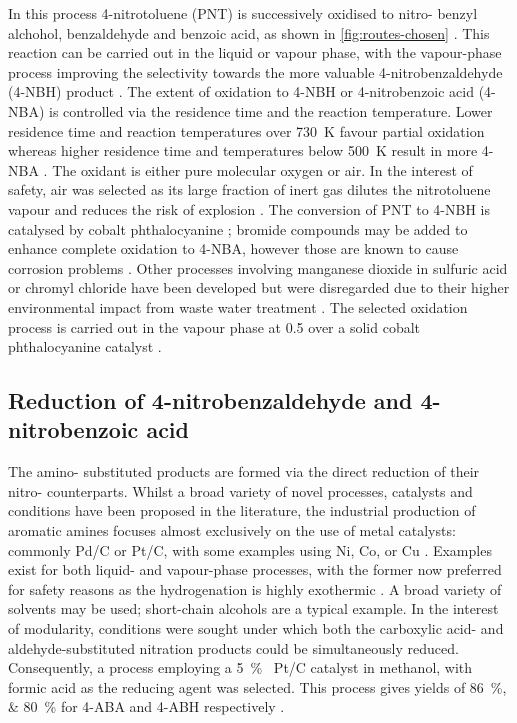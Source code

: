 In this process 4-nitrotoluene (PNT) is successively oxidised to nitro- benzyl alchohol, benzaldehyde and benzoic acid, as shown in \cref{fig:routes-chosen} \cite{hoorn_modelling_2005}. This reaction can be carried out in the liquid or vapour phase, with the vapour-phase process improving the selectivity towards the more valuable 4-nitrobenzaldehyde (4-NBH) product \cite{bruhne_benzaldehyde_2011}. 
The extent of oxidation to 4-NBH or 4-nitrobenzoic acid (4-NBA) is controlled via the residence time and the reaction temperature. Lower residence time and reaction temperatures over \SI{730}{\K} favour partial oxidation whereas higher residence time and temperatures below \SI{500}{\K} result in more 4-NBA \cite{bruhne_benzaldehyde_2011,tan_kinetic_2010}.
The oxidant is either pure molecular oxygen or air. In the interest of safety, air was selected as its large fraction of inert  gas dilutes the nitrotoluene vapour and reduces the risk of explosion \cite{bruhne_benzaldehyde_2011}. 
The conversion of PNT to 4-NBH is catalysed by cobalt phthalocyanine \cite{wendt_reaction_1986}; bromide compounds may be added to enhance complete oxidation to 4-NBA, however those are known to cause corrosion problems \cite{opgrande_benzoic_2003}.
Other processes involving manganese dioxide in sulfuric acid or chromyl chloride have been developed but were disregarded due to their higher environmental impact from waste water treatment \cite{bruhne_benzaldehyde_2011}.
The selected oxidation process is carried out in the vapour phase at \SI{0.5}{\atm} over a solid cobalt phthalocyanine catalyst \cite{chandalia_kinetics_1999}. 


\subsection{Reduction of 4-nitrobenzaldehyde and 4-nitrobenzoic acid}

The amino- substituted products are formed via the direct reduction of their nitro- counterparts.
Whilst a broad variety of novel processes, catalysts and conditions have been proposed in the literature, the industrial production of aromatic amines focuses almost exclusively on the use of metal catalysts: commonly Pd/C or Pt/C, with some examples using Ni, Co, or Cu \cite{vogt_amines_2000,cartolano_amines_2004}.
Examples exist for both liquid- and vapour-phase processes, with the former  now preferred for safety reasons as the hydrogenation is highly exothermic \cite{vogt_amines_2000}.
A broad variety of solvents may be used; short-chain alcohols are a typical example.
In the interest of modularity, conditions were sought under which both the carboxylic acid- and aldehyde-substituted nitration products could be simultaneously reduced.
Consequently, a process employing a \SI{5}{\percent\ww} Pt/C catalyst in methanol, with formic acid as the reducing agent was selected.
This process gives yields of \SIlist{86;80}{\percent} for 4-ABA and 4-ABH respectively \cite{gowda_catalytic_2000}.	

